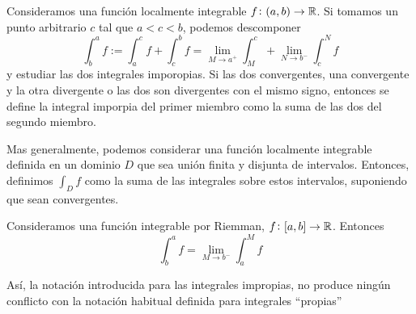 \begin{defi}
	Consideramos una función localmente integrable $f \colon (a,b) \to \mathbb{R}$. Si
	tomamos un punto arbitrario $c$ tal que $a < c < b$, podemos descomponer
	\[
		\int^a_b f := \int^c_a f + \int^b_c f = \lim_{M \to a^+} \int^c_M +
		\lim_{N \to b^-} \int^N_c f
	\]
	y estudiar las dos integrales imporopias. Si las dos convergentes, una
	convergente y la otra divergente o las dos son divergentes con el mismo
	signo, entonces se define la integral imporpia del primer miembro como la
	suma de las dos del segundo miembro.
\end{defi}
\begin{obs*}
	Mas generalmente, podemos considerar una función localmente integrable definida
	en un dominio $D$ que sea unión finita y disjunta de intervalos. Entonces,
	definimos $\int_D f$ como la suma de las integrales sobre estos intervalos,
	suponiendo que sean convergentes.
\end{obs*}

\begin{prop}
	Consideramos una función integrable por Riemman, $f \colon [a,b] \to \mathbb{R}$.
	Entonces
	\[
		\int^a_b f = \lim_{M \to b^-} \int^M_a f
	\]
\end{prop}

\begin{obs*}
	Así, la notación introducida para las integrales impropias, no produce ningún
	conflicto con la notación habitual definida para integrales ``propias''
\end{obs*}

